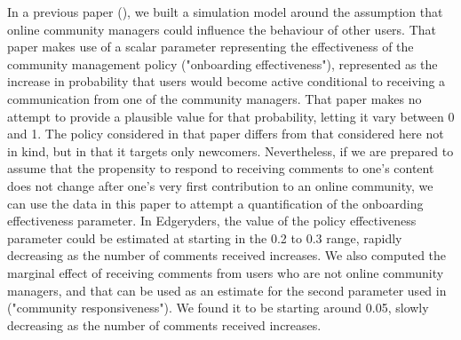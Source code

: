 In a previous paper (\cite{cottica2015online}), we built a simulation model around the assumption that online community managers could influence the behaviour of other users. That paper makes use of a scalar parameter representing the effectiveness of the community management policy ("onboarding effectiveness"), represented as the increase in probability that users would become active conditional to receiving a communication from one of the community managers. That paper makes no attempt to provide a plausible value for that probability, letting it vary between 0 and 1. The policy considered in that paper differs from that considered here not in kind, but in that it targets only newcomers. Nevertheless, if we are prepared to assume that the propensity to respond to receiving comments to one's content does not change after one's very first contribution to an online community, we can use the data in this paper to attempt a quantification of the onboarding effectiveness parameter. In Edgeryders, the value of the policy effectiveness parameter could be estimated at starting in the 0.2 to 0.3 range, rapidly decreasing as the number of comments received increases. We also computed the marginal effect of receiving comments from users who are not online community managers, and that can be used as an estimate for the second parameter used in \cite{cottica2015online} ("community responsiveness"). We found it to be starting around 0.05, slowly decreasing as the number of comments received increases. 
